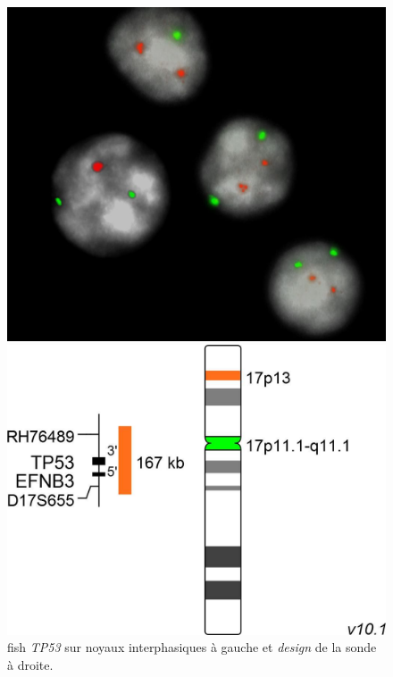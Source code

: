 \begin{figure}[H]
    \begin{minipage}{0.45\textwidth}
        \centering
        \includegraphics[width=1\textwidth]{images/fish_image.png}
    \end{minipage}
    \hfill
    \begin{minipage}{0.45\textwidth}
        \centering
        \includegraphics[width=01\textwidth]{images/fish.png}
    \end{minipage}
    \caption{
        \gls{fish} \textit{TP53} sur noyaux interphasiques à gauche et \textit{design} de la sonde à droite. 
    }
    \label{fig:fish}
\end{figure}

